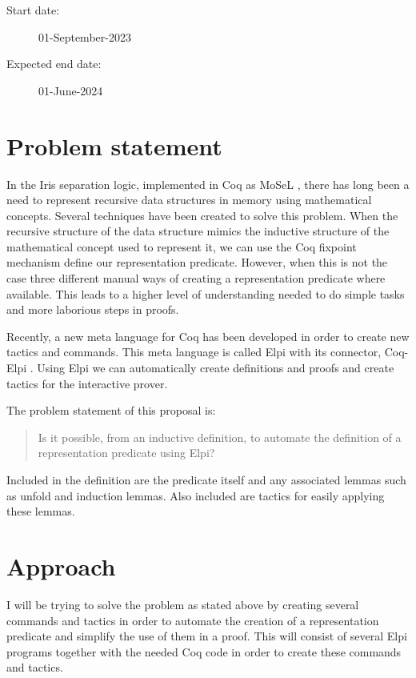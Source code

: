 \documentclass[11pt,a4paper,final]{report}
\begin{document}
\begin{description}
    \item[Start date:] 01-September-2023
    \item[Expected end date:] 01-June-2024
\end{description}

\section*{Problem statement}
In the Iris separation logic\cite*{jungIrisMonoidsInvariants2015a,jungHigherorderGhostState2016,krebbersEssenceHigherOrderConcurrent2017,jungIrisGroundModular2018}, implemented in Coq as MoSeL \cite*{krebbersInteractiveProofsHigherorder2017,krebbersMoSeLGeneralExtensible2018}, there has long been a need to represent recursive data structures in memory using mathematical concepts. Several techniques have been created to solve this problem. When the recursive structure of the data structure mimics the inductive structure of the mathematical concept used to represent it, we can use the Coq fixpoint mechanism define our representation predicate. However, when this is not the case three different manual ways of creating a representation predicate where available. This leads to a higher level of understanding needed to do simple tasks and more laborious steps in proofs.

Recently, a new meta language for Coq has been developed in order to create new tactics and commands. This meta language is called Elpi with its connector, Coq-Elpi \cite{dunchevELPIFastEmbeddable2015,guidiImplementingTypeTheory2019}. Using Elpi we can automatically create definitions and proofs and create tactics for the interactive prover.

The problem statement of this proposal is:
\begin{quote}
    Is it possible, from an inductive definition, to automate the definition of a representation predicate using Elpi?
\end{quote}
Included in the definition are the predicate itself and any associated lemmas such as unfold and induction lemmas. Also included are tactics for easily applying these lemmas.

\section*{Approach}
I will be trying to solve the problem as stated above by creating several commands and tactics in order to automate the creation of a representation predicate and simplify the use of them in a proof. This will consist of several Elpi programs together with the needed Coq code in order to create these commands and tactics.
\end{document}
